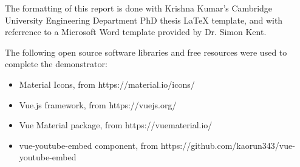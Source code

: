 
\begin{acknowledgements}      

The formatting of this report is done with Krishna Kumar's Cambridge University Engineering Department PhD thesis 
LaTeX template, and with referrence to a Microsoft Word template provided by Dr. Simon Kent.

The following open source software libraries and free resources were used to complete the demonstrator:
\begin{itemize}
    \item Material Icons, from https://material.io/icons/
    \item Vue.js framework, from https://vuejs.org/
    \item Vue Material package, from https://vuematerial.io/
    \item vue-youtube-embed component, from https://github.com/kaorun343/vue-youtube-embed

\end{itemize}


\end{acknowledgements}
